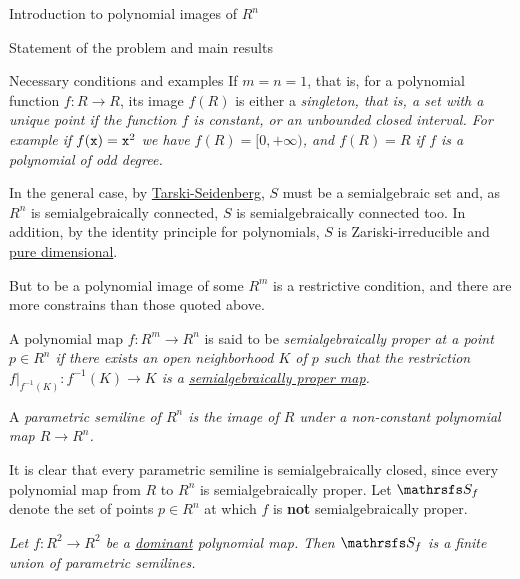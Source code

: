 \documentclass[11pt, a4paper, english, twoside, notitlepage, openright]{report}
\begin{document}
\begin{chapter}{Introduction to polynomial images of $R^n$}
\begin{section}{Statement of the problem and main results}
\begin{subsection}{Necessary conditions and examples}
If $m=n=1$, that is, for a polynomial function $f:R\to R$, its image $f(R)$ is either a \em singleton, \em that is, a set with a unique point if the function $f$ is constant, or an unbounded closed interval. For example if $f({\tt x})={\tt x}^2$ we have $f(R)=[0,+\infty)$, and $f(R)=R$ if $f$ is a polynomial of odd degree.
	
In the general case, by \hyperref[tarskiSeidenberg]{Tarski-Seidenberg}, $S$ must be a semialgebraic set and, as $R^n$ is semialgebraically connected, $S$ is semialgebraically connected too. In addition, by the identity principle for polynomials, $S$ is Zariski-irreducible and \hyperref[pureDim]{pure dimensional}.
	
		
But to be a polynomial image of some $R^m$ is a restrictive condition, and there are more constrains than those quoted above. 
	
\begin{definition} A polynomial map $f:R^m\to R^n$ is said to be \em semialgebraically proper at a point $p\in R^n$ \em if there exists an open neighborhood $K$ of $p$ such that the restriction $f|_{f^{-1}(K)}:f^{-1}(K)\to K$ is a \hyperref[properMap]{semialgebraically proper map}.
\end{definition}
	
\begin{definition} A \em parametric semiline \em of $R^n$ is the image of $R$ under a non-constant polynomial map $R\to R^n$.
\end{definition}
	
It is clear that every parametric semiline is semialgebraically closed, since every polynomial map from $R$ to $R^n$ is semialgebraically proper. Let $\S_f$ denote the set of points $p\in R^n$ at which $f$ is \textbf{not} semialgebraically proper.
	
\begin{theorem}[\em Jelonek\em]\label{jelonek}\em Let $f:R^2\to R^2$ be a \hyperref[dominant]{dominant} polynomial map. Then $\S_f$ is a finite union of parametric semilines.\em
\end{theorem}
	

\end{subsection}
\end{section}
\end{chapter}
\end{document}
